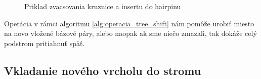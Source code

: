 \begin{figure}
\begin{subfigure}{0.3\textwidth}
  \end{subfigure}
  \begin{subfigure}{0.3\textwidth}
  \end{subfigure}

  \caption{Priklad zvacsovania kruznice a insertu do hairpinu}
  \label{obr:insert_circle_hairpin}
\end{figure}

Operácia v rámci algoritmu \ref{alg:operacia_tree_shift} nám pomôže urobiť miesto na novo vložené bázové páry,
alebo naopak ak sme niečo zmazali, tak dokáže celý podstrom pritiahnuť späť.

\subsection{Vkladanie nového vrcholu do stromu}


